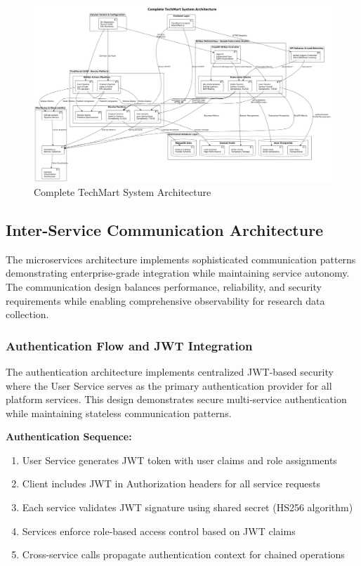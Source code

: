 \begin{figure}[h]
\centering
\includegraphics[width=1.0\textwidth]{figures/Complete-System-Architecture-Diagram.png}
\caption{Complete TechMart System Architecture}
\label{fig:complete-system-architecture}
\end{figure}


\subsection{Inter-Service Communication Architecture}

The microservices architecture implements sophisticated communication patterns demonstrating enterprise-grade integration while maintaining service autonomy. The communication design balances performance, reliability, and security requirements while enabling comprehensive observability for research data collection.

\subsubsection{Authentication Flow and JWT Integration}

The authentication architecture implements centralized JWT-based security where the User Service serves as the primary authentication provider for all platform services. This design demonstrates secure multi-service authentication while maintaining stateless communication patterns.

\textbf{Authentication Sequence:}
\begin{enumerate}
\item User Service generates JWT token with user claims and role assignments
\item Client includes JWT in Authorization headers for all service requests
\item Each service validates JWT signature using shared secret (HS256 algorithm)
\item Services enforce role-based access control based on JWT claims
\item Cross-service calls propagate authentication context for chained operations
\end{enumerate}

